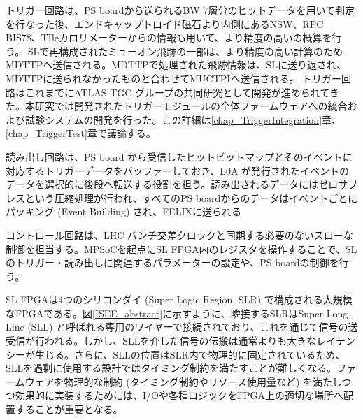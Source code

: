 トリガー回路は、PS boardから送られるBW 7層分のヒットデータを用いて\pt 判定を行なった後、エンドキャップトロイド磁石より内側にあるNSW、RPC BIS78、TIleカロリメーターからの情報も用いて、より精度の高い\pt の概算を行う。
SLで再構成されたミューオン飛跡の一部は、より精度の高い\pt 計算のためMDTTPへ送信される。MDTTPで処理された飛跡情報は、SLに送り返され、MDTTPに送られなかったものと合わせてMUCTPIへ送信される。
トリガー回路はこれまでにATLAS TGC グループの共同研究として開発が進められてきた。本研究では開発されたトリガーモジュールの全体ファームウェアへの統合および試験システムの開発を行った。この詳細は\ref{chap_TriggerIntegration}章、\ref{chap_TriggerTest}章で議論する。

読み出し回路は、PS board から受信したヒットビットマップとそのイベントに対応するトリガーデータをバッファーしておき、L0A が発行されたイベントのデータを選択的に後段へ転送する役割を担う。読み出されるデータにはゼロサプレスという圧縮処理が行われ、すべてのPS boardからのデータはイベントごとにパッキング  (Event Building) され、FELIXに送られる

コントロール回路は、LHC バンチ交差クロックと同期する必要のないスローな制御を担当する。MPSoCを起点にSL FPGA内のレジスタを操作することで、SLのトリガー・読み出しに関連するパラメーターの設定や、PS boardの制御を行う。

SL FPGAは4つのシリコンダイ (Super Logic Region, SLR) で構成される大規模なFPGAである。図\ref{ISEE_abstract}に示すように、隣接するSLRはSuper Long Line (SLL) と呼ばれる専用のワイヤーで接続されており、これを通じて信号の送受信が行われる。しかし、SLLを介した信号の伝搬は通常よりも大きなレイテンシーが生じる。さらに、SLLの位置はSLR内で物理的に固定されているため、SLLを過剰に使用する設計ではタイミング制約を満たすことが難しくなる。ファームウェアを物理的な制約 (タイミング制約やリソース使用量など) を満たしつつ効果的に実装するためには、I/Oや各種ロジックをFPGA上の適切な場所へ配置することが重要となる。

